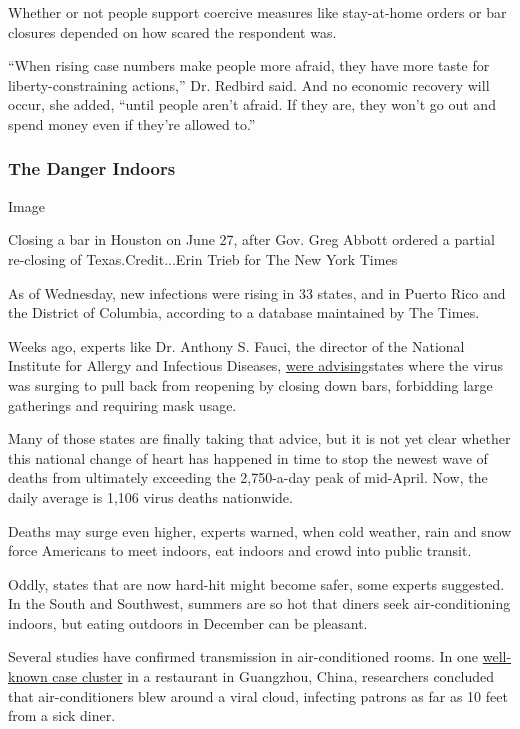 Whether or not people support coercive measures like stay-at-home orders
or bar closures depended on how scared the respondent was.

``When rising case numbers make people more afraid, they have more taste
for liberty-constraining actions,'' Dr. Redbird said. And no economic
recovery will occur, she added, ``until people aren't afraid. If they
are, they won't go out and spend money even if they're allowed to.''

\hypertarget{the-danger-indoors}{%
\subsubsection{The Danger Indoors}\label{the-danger-indoors}}

Image

Closing a bar in Houston on June 27, after Gov. Greg Abbott ordered a
partial re-closing of Texas.Credit...Erin Trieb for The New York Times

As of Wednesday, new infections were rising in 33 states, and in Puerto
Rico and the District of Columbia, according to a database maintained by
The Times.

Weeks ago, experts like Dr. Anthony S. Fauci, the director of the
National Institute for Allergy and Infectious Diseases,
\href{https://www.pbs.org/newshour/show/how-fauci-says-the-u-s-can-get-control-of-the-pandemic}{were
advising}states where the virus was surging to pull back from reopening
by closing down bars, forbidding large gatherings and requiring mask
usage.

Many of those states are finally taking that advice, but it is not yet
clear whether this national change of heart has happened in time to stop
the newest wave of deaths from ultimately exceeding the 2,750-a-day peak
of mid-April. Now, the daily average is 1,106 virus deaths nationwide.

Deaths may surge even higher, experts warned, when cold weather, rain
and snow force Americans to meet indoors, eat indoors and crowd into
public transit.

Oddly, states that are now hard-hit might become safer, some experts
suggested. In the South and Southwest, summers are so hot that diners
seek air-conditioning indoors, but eating outdoors in December can be
pleasant.

Several studies have confirmed transmission in air-conditioned rooms. In
one
\href{https://www.nytimes3xbfgragh.onion/2020/04/20/health/airflow-coronavirus-restaurants.html}{well-known
case cluster} in a restaurant in Guangzhou, China, researchers concluded
that air-conditioners blew around a viral cloud, infecting patrons as
far as 10 feet from a sick diner.

